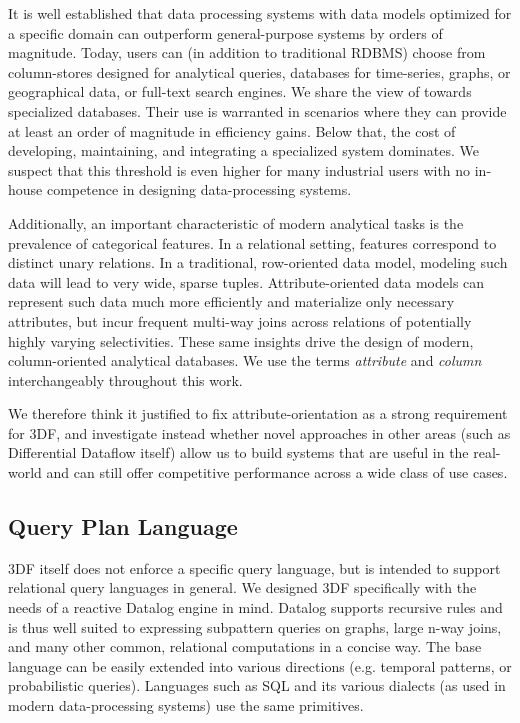 \documentclass[../index.tex]{subfiles}
\begin{document}
It is well established that data processing systems with data models
optimized for a specific domain can outperform general-purpose systems
by orders of magnitude. Today, users can (in addition to traditional
RDBMS) choose from column-stores designed for analytical queries,
databases for time-series, graphs, or geographical data, or full-text
search engines. We share the view of \cite{aref2015design} towards
specialized databases. Their use is warranted in scenarios where they
can provide at least an order of magnitude in efficiency gains. Below
that, the cost of developing, maintaining, and integrating a
specialized system dominates. We suspect that this threshold is even
higher for many industrial users with no in-house competence in
designing data-processing systems.

Additionally, an important characteristic of modern analytical tasks
is the prevalence of categorical features. In a relational setting,
features correspond to distinct unary relations. In a traditional,
row-oriented data model, modeling such data will lead to very wide,
sparse tuples. Attribute-oriented data models can represent such data
much more efficiently and materialize only necessary attributes, but
incur frequent multi-way joins across relations of potentially highly
varying selectivities. These same insights drive the design of modern,
column-oriented analytical databases. We use the terms
\emph{attribute} and \emph{column} interchangeably throughout this
work.

We therefore think it justified to fix attribute-orientation as a
strong requirement for 3DF, and investigate instead whether novel
approaches in other areas (such as Differential Dataflow itself) allow
us to build systems that are useful in the real-world and can still
offer competitive performance across a wide class of use cases.

\subsection{Query Plan Language}

3DF itself does not enforce a specific query language, but is intended
to support relational query languages in general. We designed 3DF
specifically with the needs of a reactive Datalog engine in
mind. Datalog supports recursive rules and is thus well suited to
expressing subpattern queries on graphs, large n-way joins, and many
other common, relational computations in a concise way. The base
language can be easily extended into various directions (e.g. temporal
patterns, or probabilistic queries). Languages such as SQL and its
various dialects (as used in modern data-processing systems) use the
same primitives.
\end{document}

